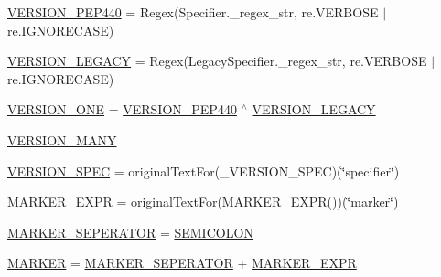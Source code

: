 \begin{DoxyCompactItemize}
\item 
\hyperlink{namespacesetuptools_1_1__vendor_1_1packaging_1_1requirements_ae2033347054926e02113f5683b180b9c}{V\+E\+R\+S\+I\+O\+N\+\_\+\+P\+E\+P440} = Regex(Specifier.\+\_\+regex\+\_\+str, re.\+V\+E\+R\+B\+O\+SE $\vert$ re.\+I\+G\+N\+O\+R\+E\+C\+A\+SE)
\item 
\hyperlink{namespacesetuptools_1_1__vendor_1_1packaging_1_1requirements_aa1b80312deccd0bc12c4e765d4c11863}{V\+E\+R\+S\+I\+O\+N\+\_\+\+L\+E\+G\+A\+CY} = Regex(Legacy\+Specifier.\+\_\+regex\+\_\+str, re.\+V\+E\+R\+B\+O\+SE $\vert$ re.\+I\+G\+N\+O\+R\+E\+C\+A\+SE)
\item 
\hyperlink{namespacesetuptools_1_1__vendor_1_1packaging_1_1requirements_a9b934e9350d77dc64ca897b56e9aa3b3}{V\+E\+R\+S\+I\+O\+N\+\_\+\+O\+NE} = \hyperlink{namespacesetuptools_1_1__vendor_1_1packaging_1_1requirements_ae2033347054926e02113f5683b180b9c}{V\+E\+R\+S\+I\+O\+N\+\_\+\+P\+E\+P440} $^\wedge$ \hyperlink{namespacesetuptools_1_1__vendor_1_1packaging_1_1requirements_aa1b80312deccd0bc12c4e765d4c11863}{V\+E\+R\+S\+I\+O\+N\+\_\+\+L\+E\+G\+A\+CY}
\item 
\hyperlink{namespacesetuptools_1_1__vendor_1_1packaging_1_1requirements_a7f04e5db21ea049b6d445b05f58410f5}{V\+E\+R\+S\+I\+O\+N\+\_\+\+M\+A\+NY}
\item 
\hyperlink{namespacesetuptools_1_1__vendor_1_1packaging_1_1requirements_ac834744e2dbb435b5cb01d5d818bf143}{V\+E\+R\+S\+I\+O\+N\+\_\+\+S\+P\+EC} = original\+Text\+For(\+\_\+\+V\+E\+R\+S\+I\+O\+N\+\_\+\+S\+P\+EC)(\char`\"{}specifier\char`\"{})
\item 
\hyperlink{namespacesetuptools_1_1__vendor_1_1packaging_1_1requirements_a2ee97f712c0b4a04e3de464b397422f9}{M\+A\+R\+K\+E\+R\+\_\+\+E\+X\+PR} = original\+Text\+For(M\+A\+R\+K\+E\+R\+\_\+\+E\+X\+PR())(\char`\"{}marker\char`\"{})
\item 
\hyperlink{namespacesetuptools_1_1__vendor_1_1packaging_1_1requirements_a366d21ae03301f7e8ad4e13d03954cf2}{M\+A\+R\+K\+E\+R\+\_\+\+S\+E\+P\+E\+R\+A\+T\+OR} = \hyperlink{namespacesetuptools_1_1__vendor_1_1packaging_1_1requirements_a31fea56c8581014a0444b509f2739426}{S\+E\+M\+I\+C\+O\+L\+ON}
\item 
\hyperlink{namespacesetuptools_1_1__vendor_1_1packaging_1_1requirements_a8720aaa659500c31754a1fad01b838b6}{M\+A\+R\+K\+ER} = \hyperlink{namespacesetuptools_1_1__vendor_1_1packaging_1_1requirements_a366d21ae03301f7e8ad4e13d03954cf2}{M\+A\+R\+K\+E\+R\+\_\+\+S\+E\+P\+E\+R\+A\+T\+OR} + \hyperlink{namespacesetuptools_1_1__vendor_1_1packaging_1_1requirements_a2ee97f712c0b4a04e3de464b397422f9}{M\+A\+R\+K\+E\+R\+\_\+\+E\+X\+PR}

\end{DoxyCompactItemize}
